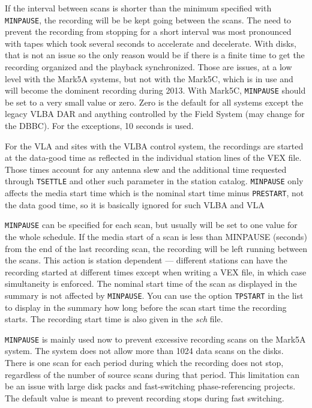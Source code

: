 \documentclass{report}
\begin{document}
If the interval between scans is shorter than the minimum specified
with {\tt MINPAUSE}, the recording will be be kept going between the
scans.  The need to prevent the recording from stopping for a short
interval was most pronounced with tapes which took several seconds to
accelerate and decelerate.  With disks, that is not an issue so the
only reason would be if there is a finite time to get the recording
organized and the playback synchronized.  Those are issues, at a low
level with the Mark5A systems, but not with the Mark5C, which is in
use and will become the dominent recording during 2013.  With Mark5C,
{\tt MINPAUSE} should be set to a very small value or zero.  Zero is
the default for all systems except the legacy VLBA DAR and anything
controlled by the Field System (may change for the DBBC).  For the
exceptions, 10 seconds is used.

For the VLA and sites with the VLBA control system, the recordings are
started at the data-good time as reflected in the individual station
lines of the VEX file.  Those times account for any antenna slew and
the additional time requested through {\tt TSETTLE} and other such
parameter in the station catalog.  {\tt MINPAUSE} only affects the
media start time which is the nominal start time minus {\tt PRESTART},
not the data good time, so it is basically ignored for such VLBA and
VLA

{\tt MINPAUSE} can be specified for each scan, but usually will be set
to one value for the whole schedule.  If the media start of a scan is
less than MINPAUSE (seconds) from the end of the last recording scan,
the recording will be left running between the scans.  This action is
station dependent --- different stations can have the recording
started at different times except when writing a VEX file, in which
case simultaneity is enforced.  The nominal start time of the scan as
displayed in the summary is not affected by {\tt MINPAUSE}.  You can
use the option {\tt TPSTART} in the  list to display in the summary how long before
the scan start time the recording starts.  The recording start time is
also given in the {\sl sch} file.

{\tt MINPAUSE} is mainly used now to prevent excessive recording scans
on the Mark5A system.  The system does not allow more than 1024
data scans on the disks.  There is one scan for each period during which
the recording does not stop, regardless of the number of source scans
during that period.  This limitation can be an issue with large disk
packs and fast-switching phase-referencing projects.  The default
value is meant to prevent recording stops during fast switching.
\end{document}
